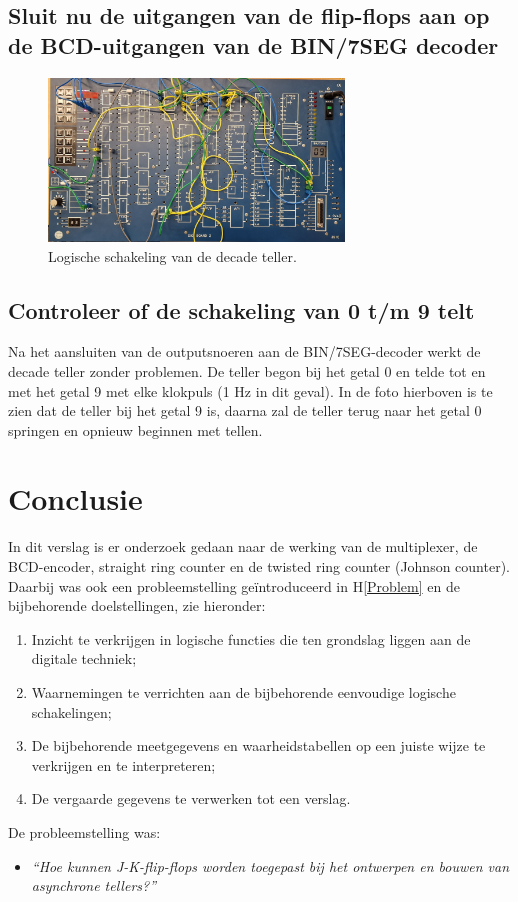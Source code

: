 \documentclass[12pt]{article}
\begin{document}
\subsection{ Sluit nu de uitgangen van de flip-flops aan op de BCD-uitgangen van de BIN/7SEG decoder}
\begin{figure}[h]
    \centering
    \includegraphics[width=0.7\textwidth]{9SEGCLK.jpg}
    \caption{Logische schakeling van de decade teller.}
    \label{fig:9mod}
\end{figure}

\subsection{Controleer of de schakeling van 0 t/m 9 telt}
Na het aansluiten van de outputsnoeren aan de BIN/7SEG-decoder werkt de decade teller zonder problemen. 
De teller begon bij het getal 0 en telde tot en met het getal 9 met elke klokpuls (1 Hz in dit geval). 
In de foto hierboven is te zien dat de teller bij het getal 9 is, daarna zal de teller terug naar het getal 0 springen en opnieuw beginnen met tellen. 


\pagebreak
\section{Conclusie}
\label{Conclusie}
In dit verslag is er onderzoek gedaan naar de werking van de multiplexer, de BCD-encoder, straight ring counter en de twisted ring counter (Johnson counter). 
Daarbij was ook een probleemstelling geïntroduceerd in H\ref{Problem} en de bijbehorende doelstellingen, zie hieronder:
\begin{enumerate}
    \item Inzicht te verkrijgen in logische functies die ten grondslag liggen aan de digitale techniek;
    \item Waarnemingen te verrichten aan de bijbehorende eenvoudige logische schakelingen;
    \item De bijbehorende meetgegevens en waarheidstabellen op een juiste wijze te verkrijgen en te interpreteren;
    \item De vergaarde gegevens te verwerken tot een verslag.
\end{enumerate}
De probleemstelling was:
\begin{itemize}
    \item \textit{``Hoe kunnen J-K-flip-flops worden toegepast bij het ontwerpen en bouwen van asynchrone tellers?''}
\end{itemize}
 
\end{document}
